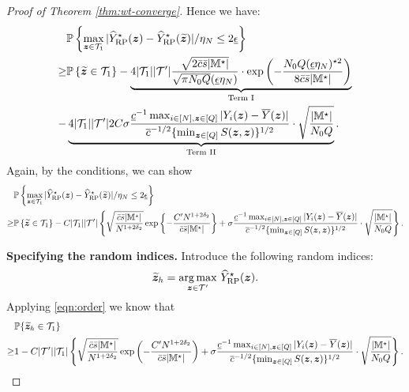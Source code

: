 \documentclass[12pt]{article}
\begin{document}
\begin{proof}[Proof of Theorem \ref{thm:wt-converge}]
Hence we  have:
\begin{align*}
    &{\mathbb{P}}\left\{\max_{{\boldsymbol{z}}\in{\mathcal{T}}_{1}}|{\widehat{Y}}^\star_{\operatorname{RP}}({\boldsymbol{z}}) - {\widehat{Y}}^\star_{\operatorname{RP}}(\widetilde{{\boldsymbol{z}}})|/\eta_N \le 2\underline{\epsilon}\right\} \\
    \ge & {\mathbb{P}}\left\{\widetilde{{\boldsymbol{z}}}\in {\mathcal{T}}_{1}\right\} -   \underbrace{4|{\mathcal{T}}_{1}| |{\mathcal{T}}'|  \frac{\sqrt{2\bar{c}\bar{s}|{\mathbb{M}}^\star|}}{\sqrt{\pi N_0Q }({\underline{\epsilon}\eta_N})}\cdot \exp\left(-\frac{ N_0Q ({\underline{\epsilon}\eta_N})^{\star 2}}{8\bar{c}\bar{s}|{\mathbb{M}}^\star|}\right)}_{\text{Term I}}\notag\\
    - &  \underbrace{4|{\mathcal{T}}_{1}| |{\mathcal{T}}'| 2C\sigma   \frac{ \underline{c}^{-1} \max_{i\in[N],{\boldsymbol{z}}\in[Q]}|Y_i({\boldsymbol{z}})-\overline{Y}({\boldsymbol{z}})|}{ {\overline{c}^{-1/2} \{\min_{{\boldsymbol{z}}\in[Q]} S({\boldsymbol{z}},{\boldsymbol{z}})}\}^{1/2}}\cdot \sqrt{\frac{|{\mathbb{M}}^\star|}{N_0Q}}}_{\text{Term II}}.
\end{align*}
Again, by the conditions, we can show
\begin{align*}
    &{\mathbb{P}}\left\{\max_{{\boldsymbol{z}}\in{\mathcal{T}}_{1}}|{\widehat{Y}}^\star_{\operatorname{RP}}({\boldsymbol{z}}) - {\widehat{Y}}^\star_{\operatorname{RP}}(\widetilde{{\boldsymbol{z}}})|/\eta_N \le 2\underline{\epsilon}\right\} \\
    \ge & {\mathbb{P}}\left\{\widetilde{{\boldsymbol{z}}}\in {\mathcal{T}}_{1}\right\} 
    - C|{\mathcal{T}}_{1}| |{\mathcal{T}}'| \left\{\sqrt{\frac{\bar{c}\bar{s}|{\mathbb{M}}^\star|}{N^{1+2\delta_2}}}\exp\left\{-\frac{C'N^{1+2\delta_2}}{\bar{c}\bar{s}|{\mathbb{M}}^\star|}\right\} + \sigma   \frac{ \underline{c}^{-1} \max_{i\in[N],{\boldsymbol{z}}\in[Q]}|Y_i({\boldsymbol{z}})-\overline{Y}({\boldsymbol{z}})|}{ {\overline{c}^{-1/2} \{\min_{{\boldsymbol{z}}\in[Q]} S({\boldsymbol{z}},{\boldsymbol{z}})}\}^{1/2}}\cdot \sqrt{\frac{|{\mathbb{M}}^\star|}{N_0Q}}\right\}.
\end{align*}

\textbf{Specifying the random indices.}
    Introduce the following random indices:
    \begin{align*}
        \widetilde{{\boldsymbol{z}}}_h = \underset{{\boldsymbol{z}}\in{\mathcal{T}}'}{\arg\max}~{\widehat{Y}}^\star_{\operatorname{RP}}({\boldsymbol{z}}).
    \end{align*}
    Applying \eqref{eqn:order} we know that
    \begin{align*}
        &{\mathbb{P}}\{\widetilde{{\boldsymbol{z}}}_h\in{\mathcal{T}}_{1}\} \\
        \ge& 1 - C|{\mathcal{T}}'||{\mathcal{T}}_{1}|\left\{\sqrt{\frac{\bar{c}\bar{s}|{\mathbb{M}}^\star|}{N^{1+2\delta_2}}}\exp\left(-\frac{C'N^{1+2\delta_2}}{\bar{c}\bar{s}|{\mathbb{M}}^\star|}\right)+\sigma   \frac{ \underline{c}^{-1} \max_{i\in[N],{\boldsymbol{z}}\in[Q]}|Y_i({\boldsymbol{z}})-\overline{Y}({\boldsymbol{z}})|}{ {\overline{c}^{-1/2} \{\min_{{\boldsymbol{z}}\in[Q]} S({\boldsymbol{z}},{\boldsymbol{z}})}\}^{1/2}}\cdot \sqrt{\frac{|{\mathbb{M}}^\star|}{N_0Q}}\right\}.
    \end{align*}


\end{proof}
\end{document}
